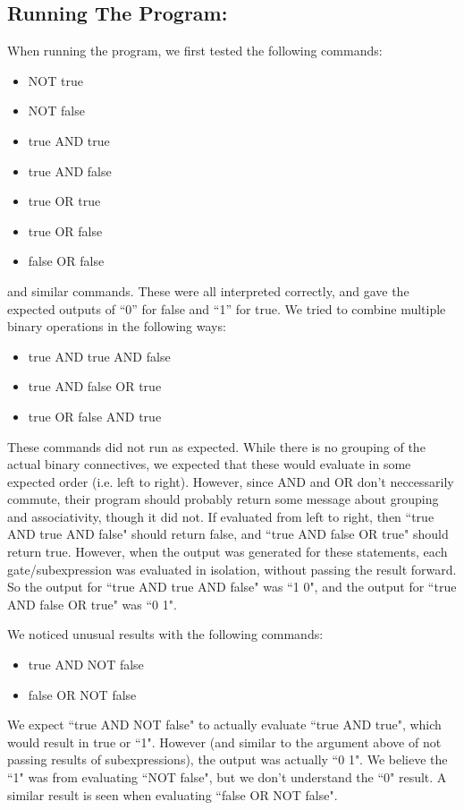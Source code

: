 \documentclass[11pt]{article}
\begin{document}
\subsection*{Running The Program:}
    When running the program, we first tested the following commands:
    \begin{itemize}
        \item NOT true
		\item NOT false
		\item true AND true
		\item true AND false
		\item true OR true
		\item true OR false
		\item false OR false
    \end{itemize}
    and similar commands. These were all interpreted correctly, and gave the expected outputs of ``0'' for false and ``1'' for true. We tried to combine multiple binary operations in the following ways:
    \begin{itemize}
        \item true AND true AND false
		\item true AND false OR true
		\item true OR false AND true
    \end{itemize}
	These commands did not run as expected. While there is no grouping of the actual binary connectives, we expected that these would evaluate in some expected order (i.e. left to right). However, since AND and OR don't neccessarily commute, their program should probably return some message about grouping and associativity, though it did not. If evaluated from left to right, then ``true AND true AND false" should return false, and ``true AND false OR true" should return true. However, when the output was generated for these statements, each gate/subexpression was evaluated in isolation, without passing the result forward. So the output for ``true AND true AND false" was ``1 0", and the output for ``true AND false OR true" was ``0 1". 

    We noticed unusual results with the following commands:
    \begin{itemize}
        \item true AND NOT false
		\item false OR NOT false
    \end{itemize}
	We expect ``true AND NOT false" to actually evaluate ``true AND true", which would result in true or ``1". However (and similar to the argument above of not passing results of subexpressions), the output was actually ``0 1". We believe the ``1" was from evaluating ``NOT false", but we don't understand the ``0" result. A similar result is seen when evaluating ``false OR NOT false".
\end{document}
